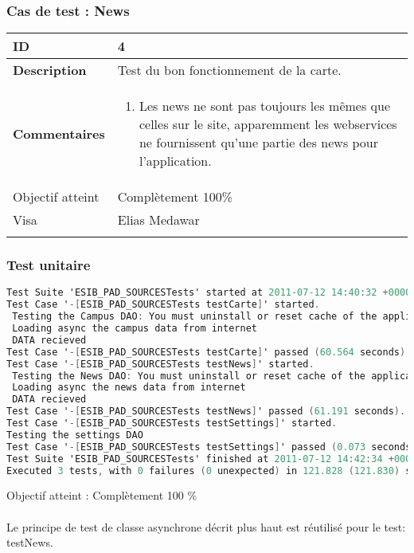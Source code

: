 		 		 \subsubsection*{Cas de test : News}
		 		 		 		 		 \begin{longtable}{m{4cm}|p{10cm}|}
		 		 		 		 		 \textbf{ ID} & 4 \\
		 		 		 		 		 \hline \textbf{Description} &  Test du bon fonctionnement de la carte.\\
		 		 		 		 		 \hline \textbf{Commentaires} &  
		 		 		 		 		 	 	 \begin{enumerate}
		 		 	 		 		 		 	 		\item Les news ne sont pas toujours les mêmes que celles sur le site, apparemment les webservices ne fournissent qu'une partie des news pour l'application.
		 		 	 		 					 	\end{enumerate} \\
		 		 	 		 		 		  				\hline Objectif atteint & {\color{green} Complètement 100\% \CheckedBox } \\
		 		 	 		 		 		  				\hline Visa & Elias Medawar 	\\
		 		 		 		 		 \\
		 		 		 		 \end{longtable} 
		 		 \subsubsection*{Test unitaire}
		 		 \begin{lstlisting}[language=C,caption = Log des test unitaires]
Test Suite 'ESIB_PAD_SOURCESTests' started at 2011-07-12 14:40:32 +0000
Test Case '-[ESIB_PAD_SOURCESTests testCarte]' started.
 Testing the Campus DAO: You must uninstall or reset cache of the application before testing
 Loading async the campus data from internet
 DATA recieved
Test Case '-[ESIB_PAD_SOURCESTests testCarte]' passed (60.564 seconds).
Test Case '-[ESIB_PAD_SOURCESTests testNews]' started.
 Testing the News DAO: You must uninstall or reset cache of the application before testing
 Loading async the news data from internet
 DATA recieved
Test Case '-[ESIB_PAD_SOURCESTests testNews]' passed (61.191 seconds).
Test Case '-[ESIB_PAD_SOURCESTests testSettings]' started.
Testing the settings DAO
Test Case '-[ESIB_PAD_SOURCESTests testSettings]' passed (0.073 seconds).
Test Suite 'ESIB_PAD_SOURCESTests' finished at 2011-07-12 14:42:34 +0000.
Executed 3 tests, with 0 failures (0 unexpected) in 121.828 (121.830) seconds
		 		 \end{lstlisting}
		 		Objectif atteint : {\color{green}Complètement 100 \% \CheckedBox}\\
		 		\\
		 		Le principe de test de classe asynchrone décrit plus haut est réutilisé pour le test: testNews.
